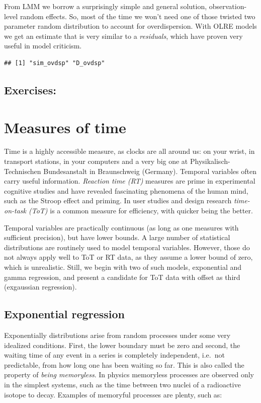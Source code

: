 \documentclass[]{svmono}
\theoremstyle{definition}
\theoremstyle{definition}
\theoremstyle{definition}
\theoremstyle{remark}
\begin{document}
From LMM we borrow a surprisingly simple and general solution,
observation-level random effects. So, most of the time we won't need one
of those twisted two parameter random distribution to account for
overdispersion. With OLRE models we get an estimate that is very similar
to a \emph{residuals}, which have proven very useful in model criticism.

\begin{verbatim}
## [1] "sim_ovdsp" "D_ovdsp"
\end{verbatim}

\subsection{Exercises:}\label{exercises-8}

\section{Measures of time}\label{measures_of_time}

Time is a highly accessible measure, as clocks are all around us: on
your wrist, in transport stations, in your computers and a very big one
at Physikalisch-Technischen Bundesanstalt in Braunschweig (Germany).
Temporal variables often carry useful information. \emph{Reaction time
(RT)} measures are prime in experimental cognitive studies and have
revealed fascinating phenomena of the human mind, such as the Stroop
effect and priming. In user studies and design research
\emph{time-on-task (ToT)} is a common measure for efficiency, with
quicker being the better.

Temporal variables are practically continuous (as long as one measures
with sufficient precision), but have lower bounds. A large number of
statistical distributions are routinely used to model temporal
variables. However, those do not always apply well to ToT or RT data, as
they assume a lower bound of zero, which is unrealistic. Still, we begin
with two of such models, exponential and gamma regression, and present a
candidate for ToT data with offset as third (exgaussian regression).

\subsection{Exponential regression}\label{exponential-regression}

Exponentially distributions arise from random processes under some very
idealized conditions. First, the lower boundary must be zero and second,
the waiting time of any event in a series is completely independent,
i.e.~not predictable, from how long one has been waiting so far. This is
also called the property of \emph{being memoryless}. In physics
memoryless processes are observed only in the simplest systems, such as
the time between two nuclei of a radioactive isotope to decay. Examples
of memoryful processes are plenty, such as:
\end{document}
